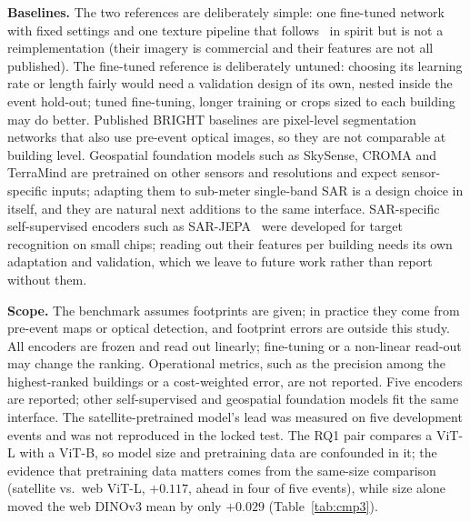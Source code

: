 \documentclass{ieeeaccess}
\begin{document}
\textbf{Baselines.} The two references are deliberately simple: one fine-tuned network with fixed settings and one texture pipeline that follows~\cite{macchiarulo2025sar} in spirit but is not a reimplementation (their imagery is commercial and their features are not all published). The fine-tuned reference is deliberately untuned: choosing its learning rate or length fairly would need a validation design of its own, nested inside the event hold-out; tuned fine-tuning, longer training or crops sized to each building may do better. Published BRIGHT baselines are pixel-level segmentation networks that also use pre-event optical images, so they are not comparable at building level. Geospatial foundation models such as SkySense, CROMA and TerraMind are pretrained on other sensors and resolutions and expect sensor-specific inputs; adapting them to sub-meter single-band SAR is a design choice in itself, and they are natural next additions to the same interface. SAR-specific self-supervised encoders such as SAR-JEPA~\cite{li2024sarjepa} were developed for target recognition on small chips; reading out their features per building needs its own adaptation and validation, which we leave to future work rather than report without them.

\textbf{Scope.} The benchmark assumes footprints are given; in practice they come from pre-event maps or optical detection, and footprint errors are outside this study. All encoders are frozen and read out linearly; fine-tuning or a non-linear read-out may change the ranking. Operational metrics, such as the precision among the highest-ranked buildings or a cost-weighted error, are not reported. Five encoders are reported; other self-supervised and geospatial foundation models fit the same interface. The satellite-pretrained model's lead was measured on five development events and was not reproduced in the locked test. The RQ1 pair compares a ViT-L with a ViT-B, so model size and pretraining data are confounded in it; the evidence that pretraining data matters comes from the same-size comparison (satellite vs.\ web ViT-L, $+0.117$, ahead in four of five events), while size alone moved the web DINOv3 mean by only $+0.029$ (Table~\ref{tab:cmp3}).

\end{document}
